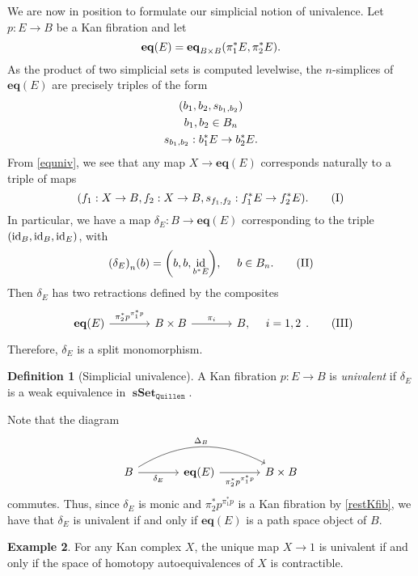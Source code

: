 \documentclass[10pt,letterpaper,cm]{nupset}
\theoremstyle{definition}
\newtheorem{definition}{Definition}[subsection]
\newtheorem{exmp}[definition]{Example}
\theoremstyle{theorem}
\theoremstyle{remark}
\newcommand{\0}{\mathbf{0}}
\newcommand{\1}{\mathbf{1}}
\newcommand{\2}{\mathbf{2}}
\DeclareMathOperator{\sset}{\mathbf{sSet}}
\newcommand{\RomanNumeralCaps}[1]
    {\MakeUppercase{\romannumeral #1}}
\DeclareMathOperator{\idd}{id}
\begin{document}
We are now in position to formulate our simplicial notion of univalence. Let $p: E \to B$ be a Kan fibration and let
\[
\mathbf{eq}(E) = \mathbf{eq}_{B\times B}\mleft(\pi_1^{\ast}{E}, \pi_2^{\ast}{E}\mright).
\]
As the product of two simplicial sets is computed levelwise, the $n$-simplices of $\mathbf{eq}(E)$ are precisely triples of the form 
\begin{gather*}
\mleft(b_1, b_2, s_{b_1, b_2}\mright)
\\ b_1, b_2\in B_n
\\ s_{b_1, b_2} : b_1^{\ast}{E} \to b_2^{\ast}{E}.
\end{gather*}
From \eqref{equniv}, we see that any map $X\to \mathbf{eq}(E)$ corresponds naturally to a triple of maps
\[ \label{trips}
\mleft(f_1: X\to B, f_2: X\to B, s_{f_1, f_2}:f_1^{\ast}{E} \to f_2^{\ast}{E}\mright). \tag{\RomanNumeralCaps{1}}
\] In particular, we have a map $\delta_E : B\to \mathbf{eq}(E)$ corresponding to the triple $\mleft(\idd_B, \idd_B, \idd_E\mright)$, with 
\[ \label{deltaE}
\mleft(\delta_E\mright)_n(b) = \mleft(b,b,\idd_{b^{\ast}{E}}\mright), \ \quad b\in B_n. \tag{\RomanNumeralCaps{2}}
\]
Then $\delta_E$ has two retractions defined by the composites
\[
\begin{tikzcd}[column sep=large] \label{splitmono}
\mathbf{eq}(E) \arrow[r, "\pi_2^{\ast}{p}^{\pi_1^{\ast}{p}}"] & B\times B \arrow[r, "\pi_i"] & {B},\ \quad {i=1,2}
\end{tikzcd}. \tag{\RomanNumeralCaps{3}}
\] Therefore, $\delta_E$ is a split monomorphism.  

\begin{definition}[Simplicial univalence]
A Kan fibration $p:E\to B$ is \textit{univalent} if $\delta_E$ is a weak equivalence in $\sset_{\mathtt{Quillen}}$.
\end{definition}

Note that the diagram
\[
\begin{tikzcd}[column sep=large]
B \arrow[r, "\delta_{E}"'] \arrow[rr, "\Delta_{B}", bend left] & \mathbf{eq}(E) \arrow[r, "\pi_2^{\ast}{p}^{\pi_1^{\ast}{p}}"'] & B\times B
\end{tikzcd}
\] commutes. Thus, since $\delta_{E}$ is monic and $\pi_2^{\ast}{p}^{\pi_1^{\ast}{p}}$ is a Kan fibration by \cref{restKfib}, we have that $\delta_{E}$ is univalent if and only if $\mathbf{eq}(E)$ is a path space object of $B$.

\begin{exmp}
For any Kan complex $X$, the unique map $X \to 1$ is univalent if and only if the space of homotopy autoequivalences of $X$ is contractible.
\end{exmp}
\end{document}
